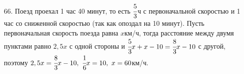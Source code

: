 66. Поезд проехал 1 час 40 минут, то есть $\cfrac{5}{3}$ч с первоначальной скоростью и 1 час со сниженной скоростью (так как опоздал на 10 минут). Пусть первоначальная скорость поезда равна $x$км/ч, тогда расстояние между двумя пунктами равно $2,5x$ с одной стороны и  $\cfrac{5}{3}x+x-10=\cfrac{8}{3}x-10$ с другой, поэтому $2,5x=\cfrac{8}{3}x-10,\ \cfrac{1}{6}x=10,\ x=60$км/ч.\\
